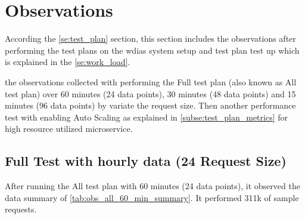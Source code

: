 \section{Observations}
According the \ref{se:test_plan} section, this section includes the observations after performing the test plans on the \acrshort{wdias} system setup and test plan test up which is explained in the \ref{se:work_load}.

 the observations collected with performing the Full test plan (also known as All test plan) over 60 minutes (24 data points), 30 minutes (48 data points) and 15 minutes (96 data points) by variate the request size. Then another performance test with enabling Auto Scaling as explained in \ref{subse:test_plan_metrics} for high resource utilized microservice.


\subsection{Full Test with hourly data (24 Request Size)}
\label{subse:obs_test_plan_all_60min}


After running the All test plan with 60 minutes (24 data points), it observed the data summary of \ref{tab:obs_all_60_min_summary}. It performed 311k of sample requests.

